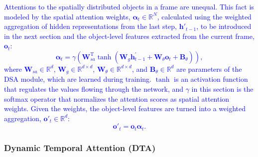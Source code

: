 \documentclass[journal]{IEEEtran}
\begin{document}
\textcolor{blue}{Attentions to the spatially distributed objects in a frame are unequal. This fact is modeled by the spatial attention weights, $\boldsymbol{\alpha}_t\in\mathbb{R}^{N}$, calculated using the weighted aggregation of hidden representations from the last step, $\boldsymbol{h}'_{t-1}$, to be introduced in the next section and the object-level features extracted from the current frame, $\boldsymbol{o}_{t}$: 
\begin{equation}
\boldsymbol{\alpha}_{t} =\gamma(\boldsymbol{W}_{sa}^\text{T}\tanh(\boldsymbol{W}_g \boldsymbol{h}^\prime_{t-1} +\boldsymbol{W}_\theta \boldsymbol{o}_{t} +\boldsymbol{B}_\theta)),
\label{eq:u_weight}
\end{equation}
where
$\boldsymbol{W}_{sa}\in\mathbb{R}^{d}$, $\boldsymbol{W}_g\in\mathbb{R}^{d\times d}$, $\boldsymbol{W}_\theta\in\mathbb{R}^{d\times d}$, and $\boldsymbol{B}_\theta\in\mathbb{R}^{d}$ are parameters of the DSA module, \textcolor{blue}{which are learned during training}. \textcolor{blue}{$\tanh$ is an activation function that regulates the values flowing through the network, and} $\gamma$ in this section is the softmax operator \textcolor{blue}{that normalizes the attention scores as spatial attention weights.}}
\textcolor{blue}{
Given the weights, the object-level features are turned into a weighted aggregation, $\boldsymbol{o}'_{t}\in\mathbb{R}^{d}$:
\begin{equation}
\boldsymbol{o}'_t =\boldsymbol{o}_{t}\boldsymbol{\alpha}_t.
\label{eq:attention_weight}
\end{equation}}

\subsubsection{Dynamic Temporal Attention (DTA)}
\end{document}
